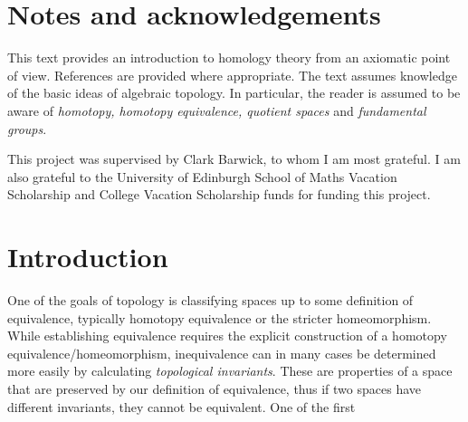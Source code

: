 \section{Notes and acknowledgements}
This text provides an introduction to homology theory from an axiomatic point of view. References are provided where appropriate. The text assumes knowledge of the basic ideas of algebraic topology. In particular, the reader is assumed to be aware of \textit{homotopy, homotopy equivalence, quotient spaces} and \textit{fundamental groups}.

This project was supervised by Clark Barwick, to whom I am most grateful. I am also grateful to the University of Edinburgh School of Maths Vacation Scholarship and College Vacation Scholarship funds for funding this project.

\section{Introduction}
One of the goals of topology is classifying spaces up to some definition of equivalence, typically homotopy equivalence or the stricter homeomorphism. While establishing equivalence requires the explicit construction of a homotopy equivalence/homeomorphism, inequivalence can in many cases be determined more easily by calculating \textit{topological invariants}. These are properties of a space that are preserved by our definition of equivalence, thus if two spaces have different invariants, they cannot be equivalent. One of the first 
